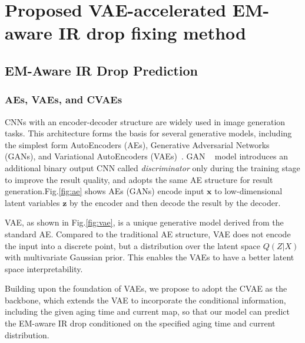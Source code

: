 \section{Proposed VAE-accelerated EM-aware IR drop fixing method}
\label{sec:strategy}

\subsection{EM-Aware IR Drop Prediction}
\label{subsec:emvae}

\subsubsection{AEs, VAEs, and CVAEs}
\label{subsec:vae_intro}

CNNs with an encoder-decoder structure are widely used in image generation tasks. 
 This architecture forms the basis for several generative models, including the simplest form AutoEncoders (AEs), Generative Adversarial Networks (GANs), and Variational AutoEncoders (VAEs)~\cite{Diederik:arxiv'22}. 
GAN ~\cite{Goodfellow:NIPS'14} model introduces an additional binary output CNN called \textit{discriminator} only during the training stage to improve the result quality, and adopts the same AE structure for result generation.Fig.\ref{fig:ae}  shows AEs (GANs) encode input $\textbf{x}$ to low-dimensional latent variables $\textbf{z}$ by the encoder and then decode the result by the decoder.


VAE, as shown in Fig.\ref{fig:vae}, is a unique generative model derived from the standard AE. Compared to the traditional AE structure, VAE does not encode the input into a discrete point, but a distribution over the latent space $Q(Z|X)$ with multivariate Gaussian prior. This enables the VAEs to have a better latent space interpretability.

Building upon the foundation of VAEs,  we propose to adopt the CVAE as the backbone, which extends the VAE to incorporate the conditional information, including the given aging time and current map, so that our model can predict the EM-aware IR drop conditioned on the specified aging time and current distribution. 

